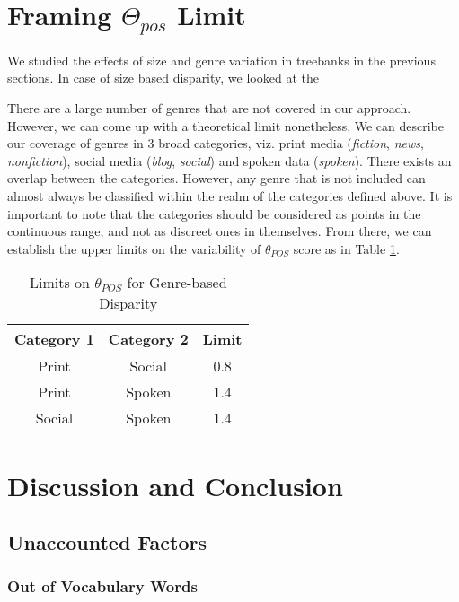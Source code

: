 \section{Framing \(\Theta_{pos}\) Limit}
\label{sec:pos-harmony-calculations}

We studied the effects of size and genre variation in treebanks in the previous sections. In case of size based disparity, we looked at the 

There are a large number of genres that are not covered in our approach. However, we can come up with a theoretical limit nonetheless. We can describe our coverage of genres in 3 broad categories, viz. print media (\textit{fiction}, \textit{news}, \textit{nonfiction}), social media (\textit{blog}, \textit{social}) and spoken data (\textit{spoken}). There exists an overlap between the categories. However, any genre that is not included can almost always be classified within the realm of the categories defined above. It is important to note that the categories should be considered as points in the continuous range, and not as discreet ones in themselves. From there, we can establish the upper limits on the variability of \(\theta_{POS}\) score as in Table \ref{tab:thetapos_genre}.

\begin{table}[h]
    \centering
    \begin{tabular}{|c|c|c|}
    \hline
    \textbf{Category 1} & \textbf{Category 2} & \textbf{Limit} \\
    \hline
    Print & Social & 0.8 \\
    Print & Spoken & 1.4 \\
    Social & Spoken & 1.4 \\
    \hline
    \end{tabular}
    \caption{Limits on \(\theta_{POS}\) for Genre-based Disparity}
    \label{tab:thetapos_genre}
\end{table}

\section{Discussion and Conclusion}
\label{sec:pos-harmony-conclusion}

\subsection{Unaccounted Factors}
\subsubsection{Out of Vocabulary Words}

